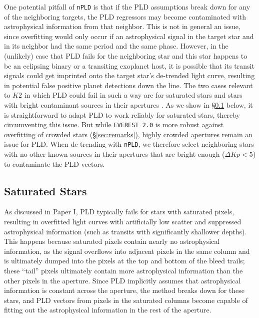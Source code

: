 \documentclass[]{aastex62}
\newcommand{\Kp}{\ensuremath{Kp}}
\begin{document}
One potential pitfall of \texttt{nPLD} is that if the PLD assumptions break down for
any of the neighboring targets, the PLD regressors may become contaminated with
astrophysical information from that neighbor. This is not in general an issue, since
overfitting would only occur if an astrophysical signal in the target star and in
its neighbor had the same period and the same phase. However, in the (unlikely) case
that PLD fails for the neighboring star and this star happens to be an eclipsing binary
or a transiting exoplanet host, it is possible that its transit signals could get imprinted onto
the target star's de-trended light curve, resulting in potential false positive planet
detections down the line. The two cases relevant to $K2$ in which PLD could fail in such
a way are for saturated stars and stars with bright contaminant sources in their
apertures \citep{Luger16}. As we show in \S\ref{sec:impl_saturated} below, it is
straightforward to adapt PLD to work reliably for saturated stars, thereby circumventing
this issue. But while
\texttt{EVEREST 2.0} is more robust against overfitting of crowded stars
(\S\ref{sec:remarks}), highly crowded apertures remain an issue for PLD. When de-trending
with \texttt{nPLD}, we therefore select neighboring stars with no other known sources
in their apertures that are bright enough ($\Delta \Kp < 5$) to contaminate the PLD
vectors.

\subsection{Saturated Stars}
\label{sec:impl_saturated}
As discussed in Paper I, PLD typically fails for stars with saturated pixels, resulting
in overfitted light curves with artificially low scatter and suppressed astrophysical
information (such as transits with significantly shallower depths). This happens because
saturated pixels contain nearly no astrophysical information, as the signal
overflows into adjacent pixels in the same column and is ultimately dumped into the
pixels at the top and bottom of the bleed trails; these ``tail'' pixels ultimately contain more
astrophysical information than the other pixels in the aperture. Since PLD implicitly
assumes that astrophysical information is constant across the aperture, the method
breaks down for these stars, and PLD vectors from pixels in the saturated columns become capable
of fitting out the astrophysical information in the rest of the aperture.
\end{document}
